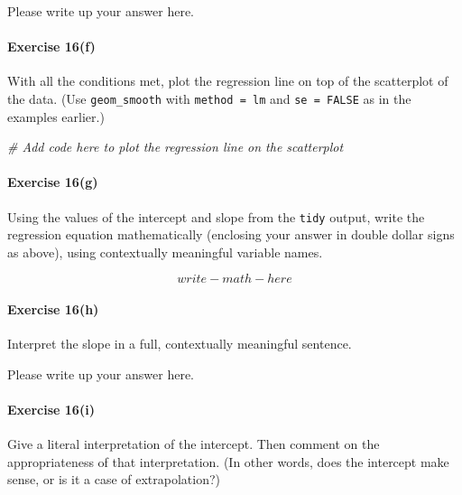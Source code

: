 \documentclass[
]{book}
\newenvironment{Shaded}{\begin{snugshade}}{\end{snugshade}}
\newcommand{\CommentTok}[1]{\textcolor[rgb]{0.56,0.35,0.01}{\textit{#1}}}
\begin{document}
Please write up your answer here.

\hypertarget{exercise-16f}{%
\paragraph*{Exercise 16(f)}\label{exercise-16f}}

With all the conditions met, plot the regression line on top of the scatterplot of the data. (Use \texttt{geom\_smooth} with \texttt{method\ =\ lm} and \texttt{se\ =\ FALSE} as in the examples earlier.)

\begin{Shaded}
\begin{Highlighting}[]
\CommentTok{\# Add code here to plot the regression line on the scatterplot}
\end{Highlighting}
\end{Shaded}

\hypertarget{exercise-16g}{%
\paragraph*{Exercise 16(g)}\label{exercise-16g}}

Using the values of the intercept and slope from the \texttt{tidy} output, write the regression equation mathematically (enclosing your answer in double dollar signs as above), using contextually meaningful variable names.

\[
write-math-here
\]

\hypertarget{exercise-16h}{%
\paragraph*{Exercise 16(h)}\label{exercise-16h}}

Interpret the slope in a full, contextually meaningful sentence.

Please write up your answer here.

\hypertarget{exercise-16i}{%
\paragraph*{Exercise 16(i)}\label{exercise-16i}}

Give a literal interpretation of the intercept. Then comment on the appropriateness of that interpretation. (In other words, does the intercept make sense, or is it a case of extrapolation?)
\end{document}
